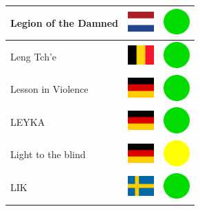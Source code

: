 \documentclass[12pt, a4paper, twoside]{report}
\begin{document}
\begin{center}
\begin{longtable}{|p{5cm}|p{2cm}|p{2cm}|}
 Legion of the Damned                                       & \includegraphics[width=1cm]{../4x3/nl} &   \includegraphics[width=1cm]{../likes/y} \\ \hline
 Leng Tch'e                                                 & \includegraphics[width=1cm]{../4x3/be} &   \includegraphics[width=1cm]{../likes/y} \\ \hline
 Lesson in Violence                                         & \includegraphics[width=1cm]{../4x3/de} &   \includegraphics[width=1cm]{../likes/y} \\ \hline
 LEYKA                                                      & \includegraphics[width=1cm]{../4x3/de} &   \includegraphics[width=1cm]{../likes/y} \\ \hline
 Light to the blind                                         & \includegraphics[width=1cm]{../4x3/de} &   \includegraphics[width=1cm]{../likes/m} \\ \hline
 LIK                                                        & \includegraphics[width=1cm]{../4x3/se} &   \includegraphics[width=1cm]{../likes/y} \\ \hline

\end{longtable}
\end{center}
\end{document}
